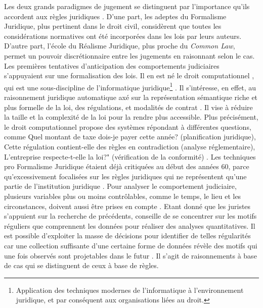 Les deux grands paradigmes de jugement se distinguent par l'importance qu'ils accordent aux règles juridiques \citep{tumonis2012legalrealism}. D'une part, les adeptes du Formalisme Juridique, plus pertinent dans le droit civil, considèrent que toutes les considérations normatives ont été incorporées dans les lois par leurs auteurs. D'autre part, l'école du Réalisme Juridique, plus proche du \og \textit{Common Law}\fg{}, permet un pouvoir discrétionnaire entre les jugements en raisonnant selon le cas. Les premières tentatives d'anticipation des comportements judiciaires s'appuyaient sur une formalisation des lois. Il en est né le \og droit computationnel \fg{}, qui est une sous-discipline de  l'\og informatique juridique\footnote{Application des techniques modernes de l'informatique à l'environnement juridique, et par conséquent aux organisations liées au droit.} \fg{}. Il  s'intéresse, en effet, au raisonnement juridique automatique axé sur la représentation sémantique riche et plus formelle de la loi, des régulations, et modalités de contrat \citep{love2005computationallaw}. Il vise à réduire la taille et la complexité de la loi pour la rendre plus accessible. Plus précisément, le \og droit computationnel \fg{} propose des systèmes répondant à différentes questions, comme \og Quel montant de taxe dois-je payer cette année? \fg{} (planification juridique), \og Cette régulation contient-elle des règles en contradiction\fg{} (analyse réglementaire),  \og L'entreprise respecte-t-elle la loi?" (vérification de la conformité) \citep{Genesereth2015computationallaw}. Les techniques pro Formalisme Juridique étaient déjà critiquées au début des années 60, parce qu'excessivement focalisées sur les règles juridiques qui ne représentent qu'une partie de l'institution juridique \citep{llewellyn1962jurisprudence}. Pour analyser le comportement judiciaire, plusieurs variables plus ou moins contrôlables, comme le temps, le lieu et les circonstances, doivent aussi être prises en compte \citep{ulmer1963quantitative}. Etant donné que les juristes s'appuient sur la recherche de précédents, \citet{ulmer1963quantitative} conseille de se concentrer sur les motifs réguliers que comprennent les données pour réaliser des analyses quantitatives. Il est possible d'exploiter la masse de décisions pour identifier de telles régularités car une collection suffisante d'une certaine forme de données révèle des motifs qui une fois observés sont projetables dans le futur \citep{ulmer1963quantitative}. Il s'agit de raisonnements à base de cas qui se distinguent de ceux à base de règles.

